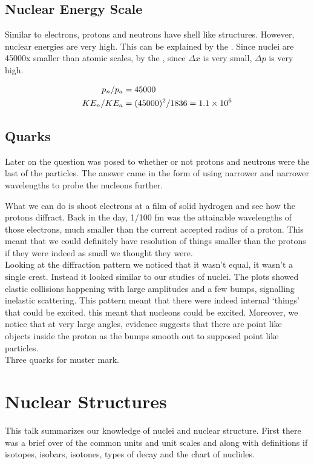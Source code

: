 \documentclass[english, 11pt]{article}
\begin{document}
\subsection{Nuclear Energy Scale}

Similar to electrons, protons and neutrons have shell like structures. However, nuclear energies are very high. This can be explained by the . Since nuclei are 45000x smaller than atomic scales, by the , since $\Delta x$ is very small, $\Delta p$ is very high.

\begin{align*}
p_n / p_a &= 45000\\
KE_n / KE_a &= (45000)^2 / 1836 = 1.1\times 10^{6}
\end{align*}

\subsection{Quarks}

Later on the question was posed to whether or not protons and neutrons were the last of the particles. The answer came in the form of using narrower and narrower wavelengths to probe the nucleons further.

What we can do is shoot electrons at a film of solid hydrogen and see how the protons diffract. Back in the day, 1/100 fm was the attainable wavelengths of those electrons, much smaller than the current accepted radius of a proton. This meant that we could definitely have resolution of things smaller than the protons if they were indeed as small we thought they were.\\

Looking at the diffraction pattern we noticed that it wasn't equal, it wasn't a single crest. Instead it looked similar to our studies of nuclei. The plots showed elastic collisions happening with large amplitudes and a few bumps, signalling inelastic scattering. This pattern meant that there were indeed internal `things' that could be excited. this meant that nucleons could be excited. Moreover, we notice that at very large angles, evidence suggests that there are point like objects inside the proton as the bumps smooth out to supposed point like particles.\\

Three quarks for muster mark.

\section{Nuclear Structures}
This talk summarizes our knowledge of nuclei and nuclear structure. First there was a brief over of the common units and unit scales and along with definitions if isotopes, isobars, isotones, types of decay and the chart of nuclides.
\end{document}
